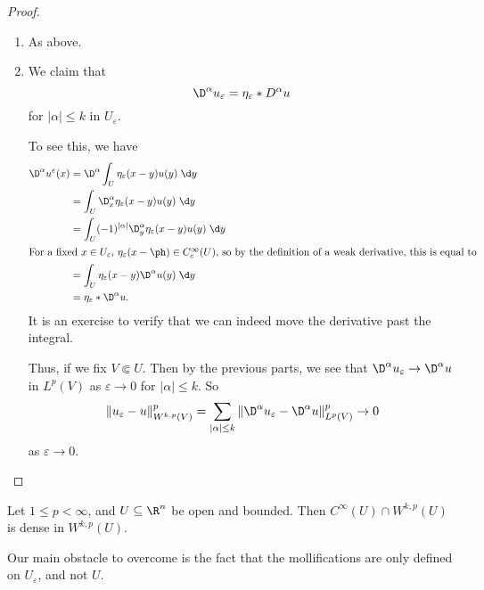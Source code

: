 \documentclass[a4paper]{article}
\begin{document}
\begin{proof}\leavevmode
  \begin{enumerate}
    \item As above.
    \item We claim that
      \[
        \D^\alpha u_\varepsilon = \eta_\varepsilon * D^\alpha u
      \]
      for $|\alpha| \leq k$ in $U_\varepsilon$.

      To see this, we have
      \begin{align*}
        \D^\alpha u^\varepsilon(x) &= \D^\alpha \int_U \eta_\varepsilon(x - y) u(y) \;\d y\\
        &= \int_U \D^\alpha_x \eta_\varepsilon (x - y) u(y)\;\d y\\
        &= \int_U (-1)^{|\alpha|} \D_y^\alpha \eta_\varepsilon(x - y) u(y)\;\d y\\
        \intertext{For a fixed $x \in U_\varepsilon$, $\eta_\varepsilon(x - \ph) \in C_c^\infty(U)$, so by the definition of a weak derivative, this is equal to}
        &= \int_U \eta_\varepsilon(x - y) \D^\alpha u(y)\;\d y\\
        &= \eta_\varepsilon * \D^\alpha u.
      \end{align*}
      It is an exercise to verify that we can indeed move the derivative past the integral.

      Thus, if we fix $V \Subset U$. Then by the previous parts, we see that $\D^\alpha u_\varepsilon \to \D^\alpha u$ in $L^p(V)$ as $\varepsilon \to 0$ for $|\alpha| \leq k$. So
      \[
        \|u_\varepsilon - u\|^p_{W^{k. p}(V)} = \sum_{|\alpha| \leq k} \|\D^\alpha u_\varepsilon - \D^\alpha u\|^p_{L^p(V)} \to 0
      \]
      as $\varepsilon \to 0$.\qedhere
  \end{enumerate}
\end{proof}

\begin{thm}
  Let $1 \leq p < \infty$, and $U \subseteq \R^n$ be open and bounded. Then $C^\infty(U) \cap W^{k, p}(U)$ is dense in $W^{k, p}(U)$.
%
%
%
\end{thm}
Our main obstacle to overcome is the fact that the mollifications are only defined on $U_\varepsilon$, and not $U$.
\end{document}
